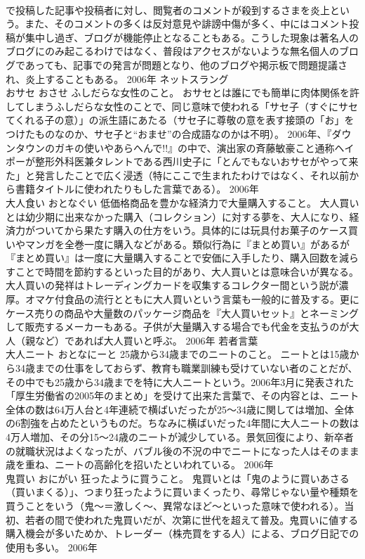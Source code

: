 \documentclass[8pt]{extreport}
\begin{document}
\begin{CJK}{UTF8}{min}
\\	で投稿した記事や投稿者に対し、閲覧者のコメントが殺到するさまを炎上という。また、そのコメントの多くは反対意見や誹謗中傷が多く、中にはコメント投稿が集中し過ぎ、ブログが機能停止となることもある。こうした現象は著名人のブログにのみ起こるわけではなく、普段はアクセスがないような無名個人のブログであっても、記事での発言が問題となり、他のブログや掲示板で問題提議され、炎上することもある。	2006年	ネットスラング	
\\	おサセ	おさせ	ふしだらな女性のこと。	おサセとは誰にでも簡単に肉体関係を許してしまうふしだらな女性のことで、同じ意味で使われる「サセ子（すぐにサセてくれる子の意）」の派生語にあたる（サセ子に尊敬の意を表す接頭の「お」をつけたものなのか、サセ子と“おませ”の合成語なのかは不明）。 2006年、『ダウンタウンのガキの使いやあらへんで!!』の中で、演出家の斉藤敏豪こと通称ヘイポーが整形外科医兼タレントである西川史子に「とんでもないおサセがやって来た」と発言したことで広く浸透（特にここで生まれたわけではなく、それ以前から書籍タイトルに使われたりもした言葉である）。	2006年	
\\	大人食い	おとなぐい	低価格商品を豊かな経済力で大量購入すること。	大人買いとは幼少期に出来なかった購入（コレクション）に対する夢を、大人になり、経済力がついてから果たす購入の仕方をいう。具体的には玩具付お菓子のケース買いやマンガを全巻一度に購入などがある。類似行為に『まとめ買い』があるが『まとめ買い』は一度に大量購入することで安価に入手したり、購入回数を減らすことで時間を節約するといった目的があり、大人買いとは意味合いが異なる。大人買いの発祥はトレーディングカードを収集するコレクター間という説が濃厚。オマケ付食品の流行とともに大人買いという言葉も一般的に普及する。更にケース売りの商品や大量数のパッケージ商品を『大人買いセット』とネーミングして販売するメーカーもある。子供が大量購入する場合でも代金を支払うのが大人（親など）であれば大人買いと呼ぶ。	2006年	若者言葉	
\\	大人ニート	おとなにーと	25歳から34歳までのニートのこと。	ニートとは15歳から34歳までの仕事をしておらず、教育も職業訓練も受けていない者のことだが、その中でも25歳から34歳までを特に大人ニートという。2006年3月に発表された「厚生労働省の2005年のまとめ」を受けて出来た言葉で、その内容とは、ニート全体の数は64万人台と4年連続で横ばいだったが25～34歳に関しては増加、全体の6割強を占めたというものだ。ちなみに横ばいだった4年間に大人ニートの数は4万人増加、その分15～24歳のニートが減少している。景気回復により、新卒者の就職状況はよくなったが、バブル後の不況の中でニートになった人はそのまま歳を重ね、ニートの高齢化を招いたといわれている。	2006年	
\\	鬼買い	おにがい	狂ったように買うこと。	鬼買いとは「鬼のように買いあさる（買いまくる）」、つまり狂ったように買いまくったり、尋常じゃない量や種類を買うことをいう（鬼～＝激しく～、異常なほど～といった意味で使われる）。当初、若者の間で使われた鬼買いだが、次第に世代を超えて普及。鬼買いに値する購入機会が多いためか、トレーダー（株売買をする人）による、ブログ日記での使用も多い。	2006年	

\end{CJK}
\end{document}
